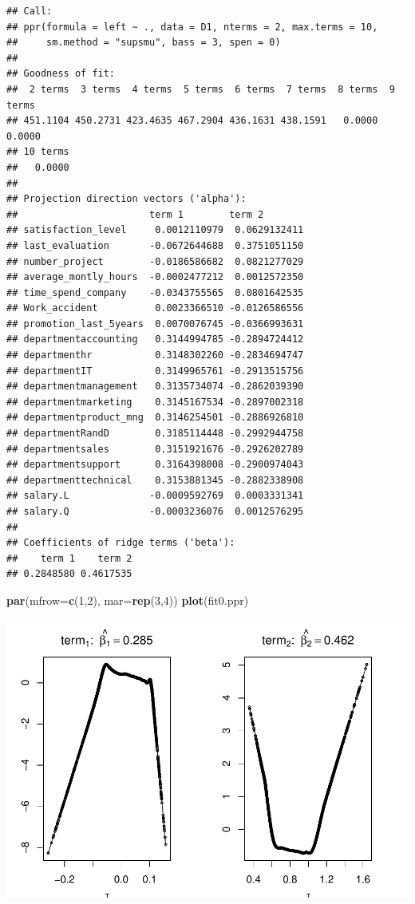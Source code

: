 \documentclass[
  11pt,
]{article}
\newenvironment{Shaded}{\begin{snugshade}}{\end{snugshade}}
\newcommand{\AttributeTok}[1]{\textcolor[rgb]{0.13,0.29,0.53}{#1}}
\newcommand{\DecValTok}[1]{\textcolor[rgb]{0.00,0.00,0.81}{#1}}
\newcommand{\FunctionTok}[1]{\textcolor[rgb]{0.13,0.29,0.53}{\textbf{#1}}}
\newcommand{\NormalTok}[1]{#1}
\begin{document}
\begin{verbatim}
## Call:
## ppr(formula = left ~ ., data = D1, nterms = 2, max.terms = 10, 
##     sm.method = "supsmu", bass = 3, spen = 0)
## 
## Goodness of fit:
##  2 terms  3 terms  4 terms  5 terms  6 terms  7 terms  8 terms  9 terms 
## 451.1104 450.2731 423.4635 467.2904 436.1631 438.1591   0.0000   0.0000 
## 10 terms 
##   0.0000 
## 
## Projection direction vectors ('alpha'):
##                       term 1        term 2       
## satisfaction_level     0.0012110979  0.0629132411
## last_evaluation       -0.0672644688  0.3751051150
## number_project        -0.0186586682  0.0821277029
## average_montly_hours  -0.0002477212  0.0012572350
## time_spend_company    -0.0343755565  0.0801642535
## Work_accident          0.0023366510 -0.0126586556
## promotion_last_5years  0.0070076745 -0.0366993631
## departmentaccounting   0.3144994785 -0.2894724412
## departmenthr           0.3148302260 -0.2834694747
## departmentIT           0.3149965761 -0.2913515756
## departmentmanagement   0.3135734074 -0.2862039390
## departmentmarketing    0.3145167534 -0.2897002318
## departmentproduct_mng  0.3146254501 -0.2886926810
## departmentRandD        0.3185114448 -0.2992944758
## departmentsales        0.3151921676 -0.2926202789
## departmentsupport      0.3164398008 -0.2900974043
## departmenttechnical    0.3153881345 -0.2882338908
## salary.L              -0.0009592769  0.0003331341
## salary.Q              -0.0003236076  0.0012576295
## 
## Coefficients of ridge terms ('beta'):
##    term 1    term 2 
## 0.2848580 0.4617535
\end{verbatim}

\begin{Shaded}
\begin{Highlighting}[]
\FunctionTok{par}\NormalTok{(}\AttributeTok{mfrow=}\FunctionTok{c}\NormalTok{(}\DecValTok{1}\NormalTok{,}\DecValTok{2}\NormalTok{), }\AttributeTok{mar=}\FunctionTok{rep}\NormalTok{(}\DecValTok{3}\NormalTok{,}\DecValTok{4}\NormalTok{))}
\FunctionTok{plot}\NormalTok{(fit0.ppr)}
\end{Highlighting}
\end{Shaded}

\includegraphics[width=0.9\linewidth]{OWUSU_project_files/figure-latex/unnamed-chunk-45-1}
\end{document}
